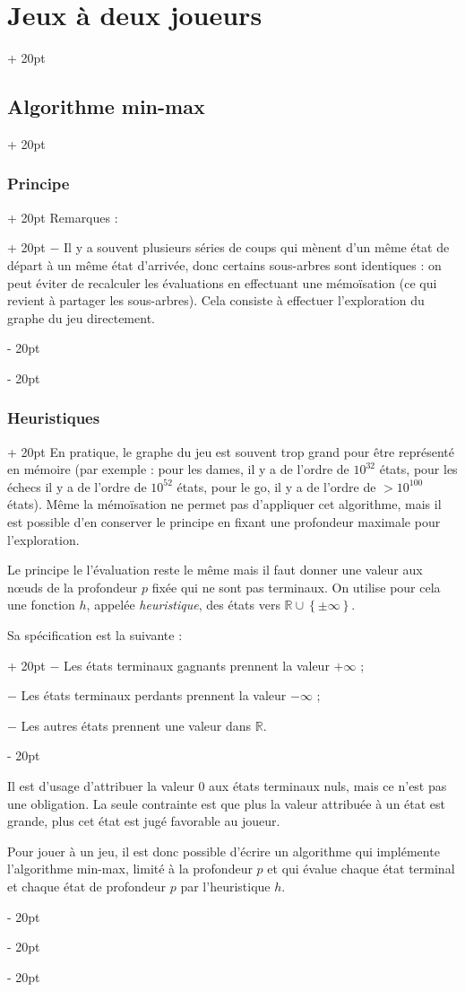 \documentclass[a4paper, 12pt, twoside]{article}
\newcommand{\R}{\mathbb{R}} %
\newcommand{\set}[1]{\left\{ #1 \right\}}
\newcommand{\ind}[1][20pt]{\advance\leftskip + #1}
\newcommand{\deind}[1][20pt]{\advance\leftskip - #1}
\newenvironment{indt}[2][20pt]{#2 \par \ind[#1]}{\par \deind} %
\begin{document}
\begin{indt}{\section{Jeux à deux joueurs}}
\begin{indt}{\subsection{Algorithme min-max}}
\begin{indt}{\subsubsection{Principe}}
\begin{indt}{Remarques :}
                    $-$ Il y a souvent plusieurs séries de coups qui mènent d'un même état de départ à un même état d'arrivée, donc certains sous-arbres sont identiques : on peut éviter de recalculer les évaluations en effectuant une mémoïsation (ce qui revient à partager les sous-arbres). Cela consiste à effectuer l'exploration du graphe du jeu directement.
                \end{indt}
            \end{indt}

            \vspace{12pt}
            
            \begin{indt}{\subsubsection{Heuristiques}}
                En pratique, le graphe du jeu est souvent trop grand pour être représenté en mémoire (par exemple : pour les dames, il y a de l'ordre de $10^{32}$ états, pour les échecs il y a de l'ordre de $10^{52}$ états, pour le go, il y a de l'ordre de $> 10^{100}$ états).
                Même la mémoïsation ne permet pas d'appliquer cet algorithme, mais il est possible d'en conserver le principe en fixant une profondeur maximale pour l'exploration.

                Le principe le l'évaluation reste le même mais il faut donner une valeur aux n\oe uds de la profondeur $p$ fixée qui ne sont pas terminaux. On utilise pour cela une fonction $h$, appelée \emph{heuristique}, des états vers $\R \cup \set{\pm \infty}$.

                \begin{indt}{Sa spécification est la suivante :}
                    $-$ Les états terminaux gagnants prennent la valeur $+\infty$ ;

                    $-$ Les états terminaux perdants prennent la valeur $-\infty$ ;

                    $-$ Les autres états prennent une valeur dans $\R$.
                \end{indt}

                Il est d'usage d'attribuer la valeur $0$ aux états terminaux nuls, mais ce n'est pas une obligation.
                La seule contrainte est que plus la valeur attribuée à un état est grande, plus cet état est jugé favorable au joueur.

                Pour jouer à un jeu, il est donc possible d'écrire un algorithme qui implémente l'algorithme min-max, limité à la profondeur $p$ et qui évalue chaque état terminal et chaque état de profondeur $p$ par l'heuristique $h$.


\end{indt}
\end{indt}
\end{indt}
\end{document}

